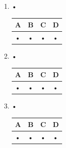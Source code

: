 \documentclass[oneside,12pt]{exam}          %
\begin{document}
\begin{enumerate}[resume*]

		

	\item •
	
		\hspace{\linewidth-\textwidth}
		\renewcommand{\arraystretch}{1.5}
		\begin{tabular}{| P{0.22\textwidth} | P{0.22\textwidth} | P{0.22\textwidth} | P{0.22\textwidth} |} \hline
			A & B & C & D \\ \hline
			• & • & • & • \\ \hline
		\end{tabular}

		

	\item •
	
		\hspace{\linewidth-\textwidth}
		\renewcommand{\arraystretch}{1.5}
		\begin{tabular}{| P{0.22\textwidth} | P{0.22\textwidth} | P{0.22\textwidth} | P{0.22\textwidth} |} \hline
			A & B & C & D \\ \hline
			• & • & • & • \\ \hline
		\end{tabular}
		
		

	\item •
	
		\hspace{\linewidth-\textwidth}
		\renewcommand{\arraystretch}{1.5}
		\begin{tabular}{| P{0.22\textwidth} | P{0.22\textwidth} | P{0.22\textwidth} | P{0.22\textwidth} |} \hline
			A & B & C & D \\ \hline
			• & • & • & • \\ \hline
		\end{tabular}
		
\end{enumerate}
\end{document}
